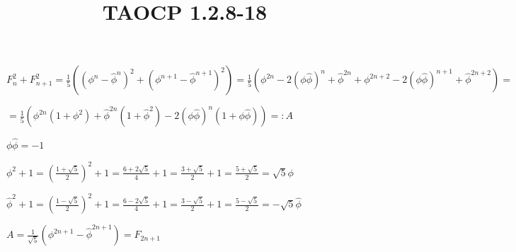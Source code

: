 \documentclass{article}
\title{TAOCP 1.2.8\mbox{-}18}
\begin{document}
\maketitle

\( F_{n}^{2} + F_{n+1}^{2} = \frac{1}{5}({(\phi^{n}-\hat\phi^{n})}^{2} + {(\phi^{n+1}-\hat\phi^{n+1})}^{2}) = \frac{1}{5}(\phi^{2n} - 2{(\phi\hat\phi)}^{n} + \hat\phi^{2n} + \phi^{2n+2} - 2{(\phi\hat\phi)}^{n+1} + \hat\phi^{2n+2}) = \)

\( = \frac{1}{5}(\phi^{2n}(1+\phi^{2}) + \hat\phi^{2n}(1+\hat\phi^{2}) - 2{(\phi\hat\phi)}^{n}(1+\phi\hat\phi)) =: A \)

\( \phi\hat\phi = -1 \)

\( \phi^{2} + 1 = {(\frac{1+\sqrt{5}}{2})}^{2} + 1 = \frac{6 + 2\sqrt{5}}{4} + 1 = \frac{3+\sqrt{5}}{2} + 1 = \frac{5+\sqrt{5}}{2} = \sqrt{5} \phi \)

\( \hat\phi^{2} + 1 = {(\frac{1-\sqrt{5}}{2})}^{2} + 1 = \frac{6 - 2\sqrt{5}}{4} + 1 = \frac{3-\sqrt{5}}{2} + 1 = \frac{5-\sqrt{5}}{2} = -\sqrt{5} \hat\phi \)

\( A = \frac{1}{\sqrt{5}}(\phi^{2n+1} - \hat\phi^{2n+1}) = F_{2n+1} \)
\end{document}
